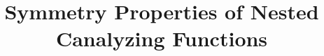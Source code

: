 \documentclass[10pt,journal,compsoc]{IEEEtran}
\begin{document}
%
\title{Symmetry Properties of Nested Canalyzing Functions}


%
%
%
%
\end{document}
